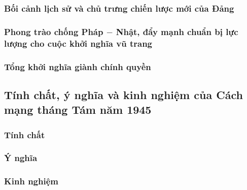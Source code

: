 \subsubsection{Bối cảnh lịch sử và chủ trưng chiến lược mới của Đảng}
\subsubsection{Phong trào chống Pháp $-$ Nhật, đẩy mạnh chuẩn bị lực lượng cho cuộc khởi nghĩa vũ trang}
\subsubsection{Tổng khởi nghĩa giành chính quyền}

\subsection{Tính chất, ý nghĩa và kinh nghiệm của Cách mạng tháng Tám năm 1945}
\subsubsection{Tính chất}
\subsubsection{Ý nghĩa}
\subsubsection{Kinh nghiệm}